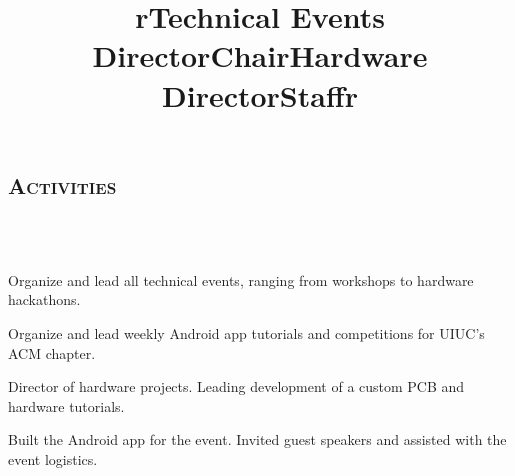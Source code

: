 \begin{resume}
\section{\textsc{Activities}}

\begin{formatb}
  \title{r}\\
  \body\\
\end{formatb}

\title{Technical Events Director}
\begin{position}
Organize and lead all technical events, ranging from workshops to hardware hackathons.
\end{position}

\title{Chair}
\begin{position}
Organize and lead weekly Android app tutorials and competitions for UIUC's ACM chapter.
\end{position}

\title{Hardware Director}
\begin{position}
Director of hardware projects. Leading development of a custom PCB and hardware tutorials.
\end{position}

\title{Staff}
\begin{position}
Built the Android app for the event. Invited guest speakers and assisted with the event logistics.
\end{position}

\begin{formatb}
  \title{r}\\
\end{formatb}

\end{resume}

